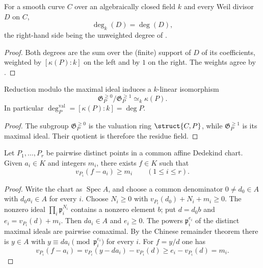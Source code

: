\begin{corollary}
  \label{cor:adelic_degK_eq_degree}
  \leanok
  For a smooth curve \(C\) over an algebraically closed field \(k\) and every
  Weil divisor \(D\) on \(C\),
  \[
    \deg_k(D) = \deg(D),
  \]
  the right-hand side being the unweighted degree of .
\end{corollary}
\begin{proof}
  \leanok
  Both degrees are the sum over the (finite) support of \(D\) of its
  coefficients, weighted by \([\kappa(P):k]\) on the left and by \(1\) on the
  right. The weights agree by .
\end{proof}

\begin{lemma}
  \label{lem:adelic_valuation_quotient_residue_field}
  Reduction modulo the maximal ideal induces a \(k\)-linear isomorphism
  \[
    \mathfrak G_P^{\ge0}/\mathfrak G_P^{\ge1}\simeq_k\kappa(P).
  \]
  In particular \(\deg_P^{\mathrm{val}}=[\kappa(P):k]=\deg P\).
\end{lemma}
\begin{proof}
  The subgroup \(\mathfrak G_P^{\ge0}\) is the valuation ring
  \(\struct{C,P}\), while \(\mathfrak G_P^{\ge1}\) is its maximal ideal.
  Their quotient is therefore the residue field.
\end{proof}

\begin{theorem}
  \label{thm:adelic_weak_approximation}
  Let \(P_1,\ldots,P_r\) be pairwise distinct points in a common affine
  Dedekind chart.  Given \(a_i\in K\) and integers \(m_i\), there exists
  \(f\in K\) such that
  \[
    v_{P_i}(f-a_i)\geq m_i\qquad(1\leq i\leq r).
  \]
\end{theorem}
\begin{proof}
  Write the chart as \(\operatorname{Spec}A\), and choose a common
  denominator \(0\ne d_0\in A\) with \(d_0a_i\in A\) for every \(i\).
  Choose \(N_i\geq0\) with
  \(v_{P_i}(d_0)+N_i+m_i\geq0\).  The nonzero ideal
  \(\prod_i\mathfrak p_i^{N_i}\) contains a nonzero element \(b\); put
  \(d=d_0b\) and \(e_i=v_{P_i}(d)+m_i\).  Then \(da_i\in A\) and
  \(e_i\geq0\).  The powers
  \(\mathfrak p_i^{e_i}\) of the distinct maximal ideals are pairwise
  comaximal.  By the Chinese remainder theorem there is \(y\in A\) with
  \(y\equiv da_i\pmod{\mathfrak p_i^{e_i}}\) for every \(i\).  For
  \(f=y/d\) one has
  \[
    v_{P_i}(f-a_i)=v_{P_i}(y-da_i)-v_{P_i}(d)
      \geq e_i-v_{P_i}(d)=m_i.
  \]
\end{proof}

